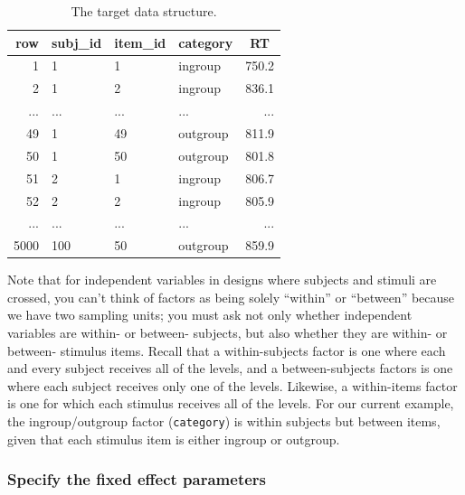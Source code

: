 \documentclass[
  english,
  doc,floatsintext]{apa6}
\begin{document}
\begin{table}[H]

\begin{center}
\begin{threeparttable}

\caption{\label{tab:data-example}The target data structure.}

\begin{tabular}{rlllr}
\toprule
row & \multicolumn{1}{c}{subj\_id} & \multicolumn{1}{c}{item\_id} & \multicolumn{1}{c}{category} & \multicolumn{1}{c}{RT}\\
\midrule
1 & 1 & 1 & ingroup & 750.2\\
2 & 1 & 2 & ingroup & 836.1\\
... & ... & ... & ... & ...\\
49 & 1 & 49 & outgroup & 811.9\\
50 & 1 & 50 & outgroup & 801.8\\
51 & 2 & 1 & ingroup & 806.7\\
52 & 2 & 2 & ingroup & 805.9\\
... & ... & ... & ... & ...\\
5000 & 100 & 50 & outgroup & 859.9\\
\bottomrule
\end{tabular}

\end{threeparttable}
\end{center}

\end{table}

Note that for independent variables in designs where subjects and stimuli are crossed, you can't think of factors as being solely \enquote{within} or \enquote{between} because we have two sampling units; you must ask not only whether independent variables are within- or between- subjects, but also whether they are within- or between- stimulus items. Recall that a within-subjects factor is one where each and every subject receives all of the levels, and a between-subjects factors is one where each subject receives only one of the levels. Likewise, a within-items factor is one for which each stimulus receives all of the levels. For our current example, the ingroup/outgroup factor (\texttt{category}) is within subjects but between items, given that each stimulus item is either ingroup or outgroup.

\hypertarget{specify-the-fixed-effect-parameters}{%
\subsubsection{Specify the fixed effect parameters}\label{specify-the-fixed-effect-parameters}}
\end{document}
